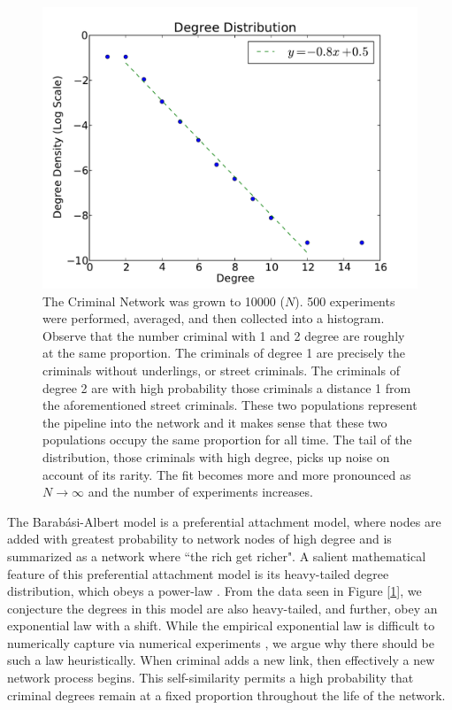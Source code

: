 \documentclass[%
 reprint,
 amsmath,amssymb,
 aps,
]{revtex4-1}
\theoremstyle{plain}
\theoremstyle{definition}
\begin{document}
\begin{figure}
\centering
\includegraphics[width=\linewidth]{DegDist.pdf}
\caption{The Criminal Network was grown to 10000 ($N$).  500 experiments were performed, averaged, and then collected into a histogram. Observe that the number criminal with 1 and 2 degree are roughly at the same proportion.  The criminals of degree 1 are precisely the criminals without underlings, or street criminals.  The criminals of degree 2 are with high probability those criminals a distance 1 from the aforementioned street criminals.  These two populations represent the pipeline into the network and it makes sense that these two populations occupy the same proportion for all time.  The tail of the distribution, those criminals with high degree, picks up noise on account of its rarity.  The fit becomes more and more pronounced as $N \to \infty$ and the number of experiments increases.}
\label{DD}
\end{figure}

The Barab\'{a}si-Albert model is a preferential attachment model, where nodes are added with greatest probability to network nodes of high degree \cite{bollscalefree, BA1} and is summarized as a network where ``the rich get richer".  A salient mathematical feature of this preferential attachment model is its heavy-tailed degree distribution, which obeys a power-law \cite{bollscalefree}.  From the data seen in Figure [\ref{DD}], we conjecture the degrees in this model are also heavy-tailed, and further, obey an exponential law with a shift.  While the empirical exponential law is difficult to numerically capture via numerical experiments \cite{powerlawempi}, we argue why there should be such a law heuristically.  When criminal adds a new link, then effectively a new network process begins.  This self-similarity permits a high probability that criminal degrees remain at a fixed proportion throughout the life of the network.
\end{document}
